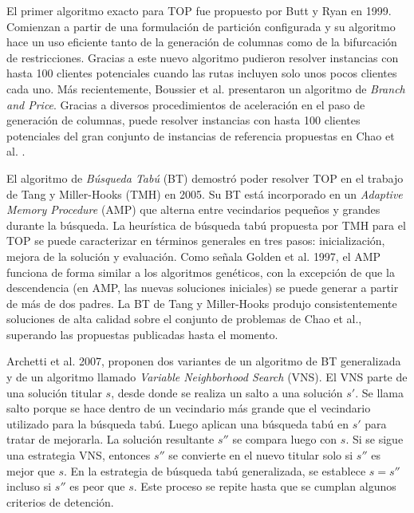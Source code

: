 \bigskip

El primer algoritmo exacto para TOP fue propuesto por Butt y Ryan \cite{ButtRyan} en 1999. Comienzan a partir de una formulación de partición configurada y su algoritmo hace un uso eficiente tanto de la generación de columnas como de la bifurcación de restricciones. Gracias a este nuevo algoritmo pudieron resolver instancias con hasta 100 clientes potenciales cuando las rutas incluyen solo unos pocos clientes cada uno. Más recientemente, Boussier et al. \cite{BoussierFeilletGendreau} presentaron un algoritmo de \textit{Branch and Price}. Gracias a diversos procedimientos de aceleración en el paso de generación de columnas, puede resolver instancias con hasta 100 clientes potenciales del gran conjunto de instancias de referencia propuestas en Chao et al. \cite{ChaoGoldenWasil}.

\bigskip

El algoritmo de \textit{Búsqueda Tabú} (BT) demostró poder resolver TOP en el trabajo de Tang y Miller-Hooks (TMH) \cite{TangMillerHooks} en 2005. Su BT está incorporado en un \textit{Adaptive Memory Procedure} (AMP) que alterna entre vecindarios pequeños y grandes durante la búsqueda. La heurística de búsqueda tabú propuesta por TMH para el TOP se puede caracterizar en términos generales en tres pasos: inicialización, mejora de la solución y evaluación. Como señala Golden et al. \cite{GoldenLaporteTaillard} 1997, el AMP funciona de forma similar a los algoritmos genéticos, con la excepción de que la descendencia (en AMP, las nuevas soluciones iniciales) se puede generar a partir de más de dos padres. La BT de Tang y Miller-Hooks produjo consistentemente soluciones de alta calidad sobre el conjunto de problemas de Chao et al., superando las propuestas publicadas hasta el momento.

\bigskip

Archetti et al. \cite{ArchettiHertzSperanza} 2007, proponen dos variantes de un algoritmo de BT generalizada y de un algoritmo llamado \textit{Variable Neighborhood Search} (VNS). El VNS parte de una solución titular $s$, desde donde se realiza un salto a una solución $s'$. Se llama salto porque se hace dentro de un vecindario más grande que el vecindario utilizado para la búsqueda tabú. Luego aplican una búsqueda tabú en $s'$ para tratar de mejorarla. La solución resultante $s''$ se compara luego con $s$. Si se sigue una estrategia VNS, entonces $s''$ se convierte en el nuevo titular solo si $s''$ es mejor que $s$. En la estrategia de búsqueda tabú generalizada, se establece $s = s''$ incluso si $s''$ es peor que $s$. Este proceso se repite hasta que se cumplan algunos criterios de detención.

